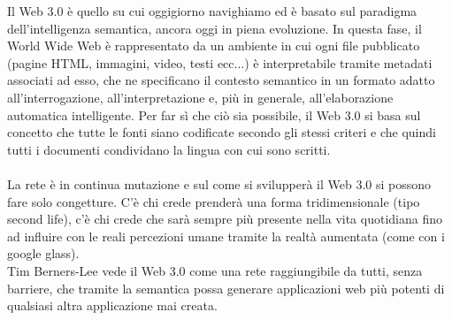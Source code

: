 \documentclass{report}%
\theoremstyle{plain}
\begin{document}
Il Web 3.0 è quello su cui oggigiorno navighiamo ed è basato sul paradigma dell'intelligenza semantica, ancora oggi in piena evoluzione. In questa fase, il World Wide Web è rappresentato da un ambiente in cui ogni file pubblicato (pagine HTML, immagini, video, testi ecc...) è interpretabile tramite metadati associati ad esso, che ne specificano il contesto semantico in un formato adatto all'interrogazione, all'interpretazione e, più in generale, all'elaborazione automatica intelligente. Per far sì che ciò sia possibile, il Web 3.0 si basa sul concetto che tutte le fonti siano codificate secondo gli stessi criteri e che quindi tutti i documenti condividano la lingua con cui sono scritti. \\\\
La rete è in continua mutazione e sul come si svilupperà il Web 3.0 si possono fare solo congetture. C'è chi crede prenderà una forma tridimensionale (tipo second life), c'è chi crede che sarà sempre più presente nella vita quotidiana fino ad influire con le reali percezioni umane tramite la realtà aumentata (come con i google glass).\\Tim Berners-Lee vede il Web 3.0 come una rete raggiungibile da tutti, senza barriere, che tramite la semantica possa generare applicazioni web più potenti di qualsiasi altra applicazione mai creata.
\end{document}
